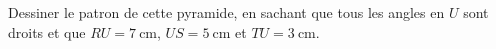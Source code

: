 
\begin{exercice}\label{exo2smath-0248}

    \begin{multicols}{2}

    Dessiner le patron de cette pyramide, en sachant que tous les angles en \( U\) sont droits et que $RU=\SI{7}{\centi\meter}$, \( US=\SI{5}{\centi\meter}\) et \( TU=\SI{3}{\centi\meter}\).

    \columnbreak

\begin{center}
    
\end{center}
    \end{multicols}

\end{exercice}
